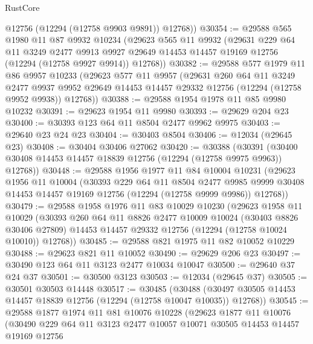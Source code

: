 \begin{lexlean}{RustCore}
\begin{coremodule}
        @12756
        (@12294 (@12758 @9903 @9891))
        @12768))
@30354 := @29588
    @565
    @1980
    @11
    @87
    @9932
    @10234
    (@29623
      @565
      @11
      @9932
      (@29631
        @229
        @64
        @11
        @3249
        @2477
        @9913
        @9927
        @29649
        @14453
        @14457
        @19169
        @12756
        (@12294 (@12758 @9927 @9914))
        @12768))
@30382 := @29588
    @577
    @1979
    @11
    @86
    @9957
    @10233
    (@29623
      @577
      @11
      @9957
      (@29631
        @260
        @64
        @11
        @3249
        @2477
        @9937
        @9952
        @29649
        @14453
        @14457
        @29332
        @12756
        (@12294 (@12758 @9952 @9938))
        @12768))
@30388 := @29588 @1954 @1978 @11 @85 @9980 @10232
@30391 := @29623 @1954 @11 @9980
@30393 := @29629 @204 @23
@30400 := @30393 @123 @64 @11 @8504 @2477 @9962 @9975
@30403 := @29640 @23 @24 @23
@30404 := @30403 @8504
@30406 := @12034 (@29645 @23)
@30408 := @30404 @30406 @27062
@30420 := @30388
    (@30391 (@30400 @30408 @14453 @14457 @18839 @12756 (@12294 (@12758 @9975 @9963)) @12768))
@30448 := @29588
    @1956
    @1977
    @11
    @84
    @10004
    @10231
    (@29623
      @1956
      @11
      @10004
      (@30393
        @229
        @64
        @11
        @8504
        @2477
        @9985
        @9999
        @30408
        @14453
        @14457
        @19169
        @12756
        (@12294 (@12758 @9999 @9986))
        @12768))
@30479 := @29588
    @1958
    @1976
    @11
    @83
    @10029
    @10230
    (@29623
      @1958
      @11
      @10029
      (@30393
        @260
        @64
        @11
        @8826
        @2477
        @10009
        @10024
        (@30403 @8826 @30406 @27809)
        @14453
        @14457
        @29332
        @12756
        (@12294 (@12758 @10024 @10010))
        @12768))
@30485 := @29588 @821 @1975 @11 @82 @10052 @10229
@30488 := @29623 @821 @11 @10052
@30490 := @29629 @206 @23
@30497 := @30490 @123 @64 @11 @3123 @2477 @10034 @10047
@30500 := @29640 @37 @24 @37
@30501 := @30500 @3123
@30503 := @12034 (@29645 @37)
@30505 := @30501 @30503 @14448
@30517 := @30485
    (@30488 (@30497 @30505 @14453 @14457 @18839 @12756 (@12294 (@12758 @10047 @10035)) @12768))
@30545 := @29588
    @1877
    @1974
    @11
    @81
    @10076
    @10228
    (@29623
      @1877
      @11
      @10076
      (@30490
        @229
        @64
        @11
        @3123
        @2477
        @10057
        @10071
        @30505
        @14453
        @14457
        @19169
        @12756

\end{coremodule}
\end{lexlean}
